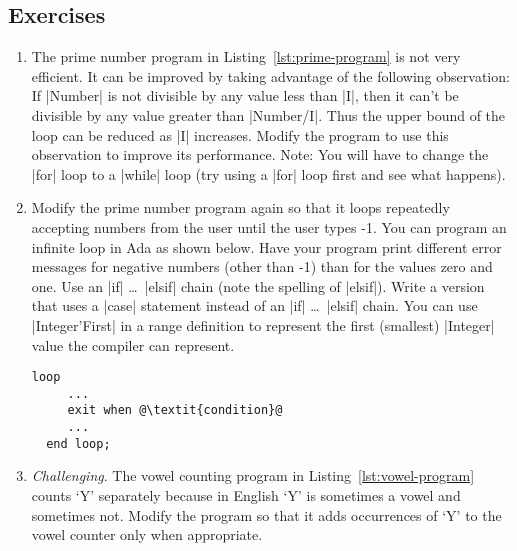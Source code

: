 \subsection*{Exercises}

\begin{enumerate}
\item The prime number program in Listing~\ref{lst:prime-program} is not very efficient. It can
  be improved by taking advantage of the following observation: If |Number| is not divisible by
  any value less than |I|, then it can't be divisible by any value greater than |Number/I|. Thus
  the upper bound of the loop can be reduced as |I| increases. Modify the program to use this
  observation to improve its performance. Note: You will have to change the |for| loop to a
  |while| loop (try using a |for| loop first and see what happens).

\item Modify the prime number program again so that it loops repeatedly accepting numbers from
  the user until the user types -1. You can program an infinite loop in Ada as shown below. Have
  your program print different error messages for negative numbers (other than -1) than for the
  values zero and one. Use an |if| \ldots\ |elsif| chain (note the spelling of |elsif|). Write a
  version that uses a |case| statement instead of an |if| \ldots\ |elsif| chain. You can use
  |Integer'First| in a range definition to represent the first (smallest) |Integer| value the
  compiler can represent.

  \begin{lstlisting}[escapechar=\@]
  loop
     ...
     exit when @\textit{condition}@
     ...
  end loop;
  \end{lstlisting}

\item \textit{Challenging}. The vowel counting program in Listing~\ref{lst:vowel-program} counts
  `Y' separately because in English `Y' is sometimes a vowel and sometimes not. Modify the
  program so that it adds occurrences of `Y' to the vowel counter only when appropriate.
\end{enumerate}


